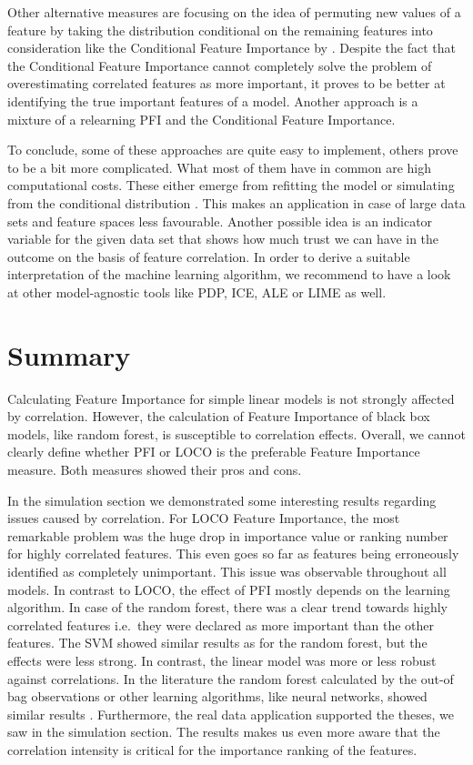 \documentclass[
]{krantz}
\begin{document}
Other alternative measures are focusing on the idea of permuting new values of a feature by taking the distribution conditional on the remaining features into consideration like the Conditional Feature Importance by \citet{strobl2008}. Despite the fact that the Conditional Feature Importance cannot completely solve the problem of overestimating correlated features as more important, it proves to be better at identifying the true important features of a model. Another approach is a mixture of a relearning PFI \citep{mentch2016} and the Conditional Feature Importance. \citep{hooker2019}

To conclude, some of these approaches are quite easy to implement, others prove to be a bit more complicated. What most of them have in common are high computational costs. These either emerge from refitting the model or simulating from the conditional distribution \citep{hooker2019}. This makes an application in case of large data sets and feature spaces less favourable. Another possible idea is an indicator variable for the given data set that shows how much trust we can have in the outcome on the basis of feature correlation. In order to derive a suitable interpretation of the machine learning algorithm, we recommend to have a look at other model-agnostic tools like PDP, ICE, ALE or LIME as well.

\hypertarget{summary-1}{%
\section{Summary}\label{summary-1}}

Calculating Feature Importance for simple linear models is not strongly affected by correlation. However, the calculation of Feature Importance of black box models, like random forest, is susceptible to correlation effects. Overall, we cannot clearly define whether PFI or LOCO is the preferable Feature Importance measure. Both measures showed their pros and cons.

In the simulation section we demonstrated some interesting results regarding issues caused by correlation. For LOCO Feature Importance, the most remarkable problem was the huge drop in importance value or ranking number for highly correlated features. This even goes so far as features being erroneously identified as completely unimportant. This issue was observable throughout all models. In contrast to LOCO, the effect of PFI mostly
depends on the learning algorithm. In case of the random forest, there was a clear trend towards highly correlated features i.e.~they were declared as more important than the other features. The SVM showed similar results as for the random forest, but the effects were less strong. In contrast, the linear model was more or less robust against correlations. In the literature the random forest calculated by the out-of bag observations or other learning algorithms, like neural networks, showed similar results \citep{hooker2019}. Furthermore, the real data application supported the theses, we saw in the simulation section. The results makes us even more aware that the correlation intensity is critical for the importance ranking of the features.
\end{document}
